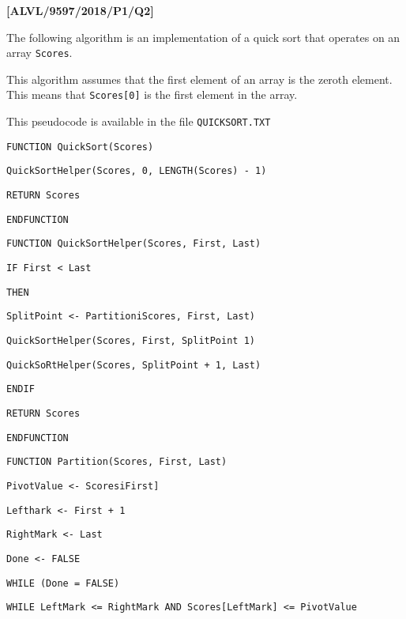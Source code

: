 \item \textbf{{[}ALVL/9597/2018/P1/Q2{]} }

The following algorithm is an implementation of a quick sort that
operates on an array \texttt{Scores}. 

This algorithm assumes that the first element of an array is the zeroth
element. This means that \texttt{Scores{[}0{]}} is the first element
in the array.

This pseudocode is available in the file \texttt{QUICKSORT.TXT}

\noindent\begin{minipage}[t]{1\columnwidth}%
\noindent \texttt{FUNCTION QuickSort(Scores)}

\noindent \texttt{\qquad{}QuickSortHelper(Scores, 0, LENGTH(Scores)
- 1)}

\noindent \texttt{\qquad{}RETURN Scores}

\noindent \texttt{ENDFUNCTION}

\bigskip{}

\noindent \texttt{FUNCTION QuickSortHelper(Scores, First, Last)}

\noindent \texttt{\qquad{}IF First < Last}

\noindent \texttt{\qquad{}THEN}

\noindent \texttt{\qquad{}\qquad{}SplitPoint <- PartitioniScores,
First, Last)}

\noindent \texttt{\qquad{}\qquad{}QuickSortHelper(Scores, First,
SplitPoint \textemdash{} 1)}

\noindent \texttt{\qquad{}\qquad{}QuickSoRtHelper(Scores, SplitPoint
+ 1, Last)}

\noindent \texttt{\qquad{}ENDIF}

\noindent \texttt{\qquad{}RETURN Scores}

\noindent \texttt{ENDFUNCTION }\bigskip{}

\noindent \texttt{FUNCTION Partition(Scores, First, Last)}

\noindent \texttt{\qquad{}PivotValue <- ScoresiFirst{]}}

\noindent \texttt{\qquad{}Lefthark <- First + 1}

\noindent \texttt{\qquad{}RightMark <- Last}

\noindent \texttt{\qquad{}Done <- FALSE}

\noindent \texttt{\qquad{}WHILE (Done = FALSE)}

\noindent \texttt{\qquad{}\qquad{}WHILE LeftMark <= RightMark AND
Scores{[}LeftMark{]} <= PivotValue}


\end{minipage}
